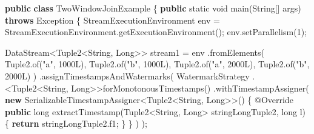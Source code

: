\documentclass[cn,11pt,chinese]{elegantbook}
\newenvironment{Shaded}{}{}
\newcommand{\AttributeTok}[1]{\textcolor[rgb]{0.49,0.56,0.16}{#1}}
\newcommand{\BuiltInTok}[1]{#1}
\newcommand{\DataTypeTok}[1]{\textcolor[rgb]{0.56,0.13,0.00}{#1}}
\newcommand{\DecValTok}[1]{\textcolor[rgb]{0.25,0.63,0.44}{#1}}
\newcommand{\FunctionTok}[1]{\textcolor[rgb]{0.02,0.16,0.49}{#1}}
\newcommand{\KeywordTok}[1]{\textcolor[rgb]{0.00,0.44,0.13}{\textbf{#1}}}
\newcommand{\NormalTok}[1]{#1}
\newcommand{\StringTok}[1]{\textcolor[rgb]{0.25,0.44,0.63}{#1}}
\begin{document}
\begin{Shaded}
\begin{Highlighting}[]
\KeywordTok{public} \KeywordTok{class}\NormalTok{ TwoWindowJoinExample \{}
    \KeywordTok{public} \DataTypeTok{static} \DataTypeTok{void} \FunctionTok{main}\NormalTok{(}\BuiltInTok{String}\NormalTok{[] args) }\KeywordTok{throws} \BuiltInTok{Exception}\NormalTok{ \{}
\NormalTok{        StreamExecutionEnvironment env = StreamExecutionEnvironment.}\FunctionTok{getExecutionEnvironment}\NormalTok{();}
\NormalTok{        env.}\FunctionTok{setParallelism}\NormalTok{(}\DecValTok{1}\NormalTok{);}

\NormalTok{        DataStream\textless{}Tuple2\textless{}}\BuiltInTok{String}\NormalTok{, }\BuiltInTok{Long}\NormalTok{\textgreater{}\textgreater{} stream1 = env}
\NormalTok{            .}\FunctionTok{fromElements}\NormalTok{(}
\NormalTok{                Tuple2.}\FunctionTok{of}\NormalTok{(}\StringTok{"a"}\NormalTok{, }\DecValTok{1000L}\NormalTok{),}
\NormalTok{                Tuple2.}\FunctionTok{of}\NormalTok{(}\StringTok{"b"}\NormalTok{, }\DecValTok{1000L}\NormalTok{),}
\NormalTok{                Tuple2.}\FunctionTok{of}\NormalTok{(}\StringTok{"a"}\NormalTok{, }\DecValTok{2000L}\NormalTok{),}
\NormalTok{                Tuple2.}\FunctionTok{of}\NormalTok{(}\StringTok{"b"}\NormalTok{, }\DecValTok{2000L}\NormalTok{)}
\NormalTok{            )}
\NormalTok{            .}\FunctionTok{assignTimestampsAndWatermarks}\NormalTok{(}
\NormalTok{                WatermarkStrategy}
\NormalTok{                    .\textless{}Tuple2\textless{}}\BuiltInTok{String}\NormalTok{, }\BuiltInTok{Long}\NormalTok{\textgreater{}\textgreater{}}\FunctionTok{forMonotonousTimestamps}\NormalTok{()}
\NormalTok{                    .}\FunctionTok{withTimestampAssigner}\NormalTok{(}
                        \KeywordTok{new}\NormalTok{ SerializableTimestampAssigner\textless{}Tuple2\textless{}}\BuiltInTok{String}\NormalTok{, }\BuiltInTok{Long}\NormalTok{\textgreater{}\textgreater{}() \{}
                            \AttributeTok{@Override}
                            \KeywordTok{public} \DataTypeTok{long} \FunctionTok{extractTimestamp}\NormalTok{(Tuple2\textless{}}\BuiltInTok{String}\NormalTok{, }\BuiltInTok{Long}\NormalTok{\textgreater{} stringLongTuple2, }\DataTypeTok{long}\NormalTok{ l) \{}
                                \KeywordTok{return}\NormalTok{ stringLongTuple2.}\FunctionTok{f1}\NormalTok{;}
\NormalTok{                            \}}
\NormalTok{                        \}}
\NormalTok{                    )}
\NormalTok{            );}


\end{Highlighting}
\end{Shaded}
\end{document}
